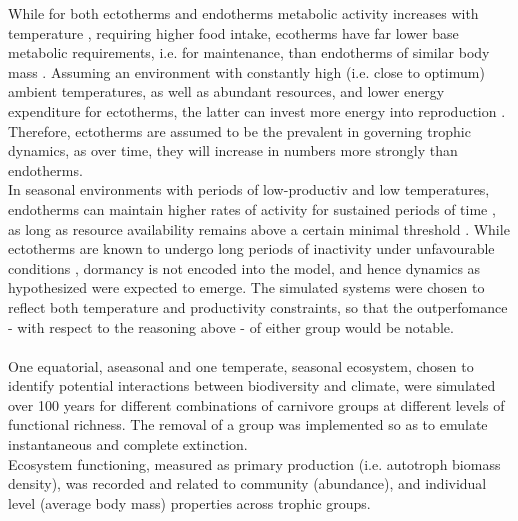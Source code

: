 While for both ectotherms and endotherms metabolic activity increases with temperature \citep{Dillon2010}, requiring higher food intake, ecotherms have far lower base metabolic requirements, i.e. for maintenance, than endotherms of similar body mass \citep{Nagy1999}. Assuming an environment with constantly high (i.e. close to optimum) ambient temperatures, as well as abundant resources,  and lower energy expenditure for ectotherms, the latter can invest more energy into reproduction \citep{Shine2005}. Therefore, ectotherms are assumed to be the prevalent in governing trophic dynamics, as over time, they will increase in numbers more strongly than endotherms.\\
In seasonal environments with periods of low-productiv and low temperatures, endotherms can maintain higher rates of activity for sustained periods of time \citep{Buckley2012}, as long as resource availability remains above a certain minimal threshold \citep{Wieser1985}. While ectotherms are known to undergo long periods of inactivity under unfavourable conditions \citep{Shine2005}, dormancy is not encoded into the model, and hence dynamics as hypothesized were expected to emerge. The simulated systems were chosen to reflect both temperature and productivity constraints, so that the outperfomance - with respect to the reasoning above - of either group would be notable.
\\\\
One equatorial, aseasonal and one temperate, seasonal ecosystem, chosen to identify potential interactions between biodiversity and climate, were simulated over 100 years for different combinations of carnivore groups at different levels of functional richness. The removal of a group was implemented so as to emulate instantaneous and complete extinction.\\
Ecosystem functioning, measured as primary production (i.e. autotroph biomass density), was recorded and related to community (abundance), and individual level (average body mass) properties across trophic groups.
%
%
%
